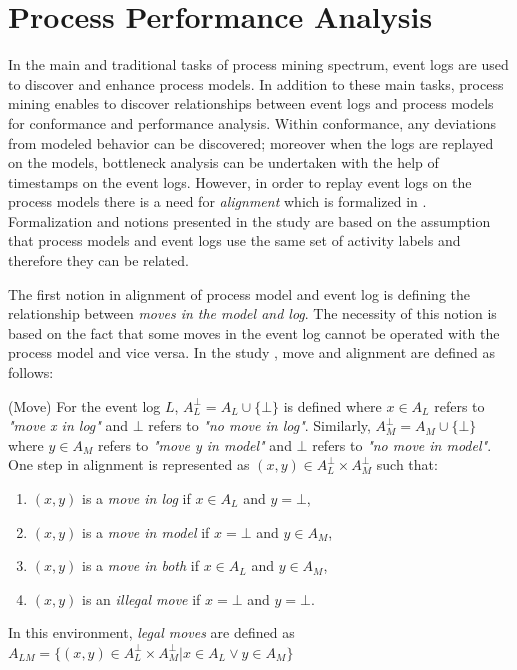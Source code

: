 \section{Process Performance Analysis}
\label{sec:process-performance-analysis}
In the main and traditional tasks of process mining spectrum, event logs are used to discover and enhance process models. In addition to these main tasks, process mining enables to discover relationships between event logs and process models for conformance and performance analysis. Within conformance, any deviations from modeled behavior can be discovered; moreover when the logs are replayed on the models, bottleneck analysis can be undertaken with the help of timestamps on the event logs. However, in order to replay event logs on the process models there is a need for \textit{alignment} which is formalized in \cite{van2012replaying}. Formalization and notions presented in the study \cite{van2012replaying} are based on the assumption that process models and event logs use the same set of activity labels and therefore they can be related.

The first notion in alignment of process model and event log is defining the relationship between \textit{moves in the model and log}. The necessity of this notion is based on the fact that some moves in the event log cannot be operated with the process model and vice versa. In the study \cite{van2012replaying}, move and alignment are defined as follows:

\theoremstyle{definition}
\begin{definition}{}
(Move) For the event log $L$, $A_{L}^{\bot} = A_{L} \cup \{ \bot\}$ is defined where $x \in A_{L}$ refers to \textit{"move x in log"} and $\bot$ refers to \textit{"no move in log"}. Similarly, $A_{M}^{\bot} = A_{M} \cup \{ \bot\}$ where $y \in A_{M}$ refers to \textit{"move y in model"} and $\bot$ refers to \textit{"no move in model"}. One step in alignment is represented as $(x,y) \in A_{L}^{\bot} \times A_{M}^{\bot}$ such that:
\begin{enumerate}
  \item $(x,y)$ is a \textit{move in log} if $ x \in A_{L}$ and $y=\bot$,
  \item $(x,y)$ is a \textit{move in model} if $x=\bot$ and $y \in A_{M}$,
  \item $(x,y)$ is a \textit{move in both} if $x \in A_{L}$ and $y \in A_{M}$,
  \item $(x,y)$ is an \textit{illegal move} if $x=\bot$ and $y=\bot$.
\end{enumerate}
In this environment, \textit{legal moves} are defined as $A_{LM} = \{ (x,y) \in A_{L}^{\bot} \times A_{M}^{\bot} |  x \in A_{L} \vee y \in A_{M} \}$
\end{definition}

